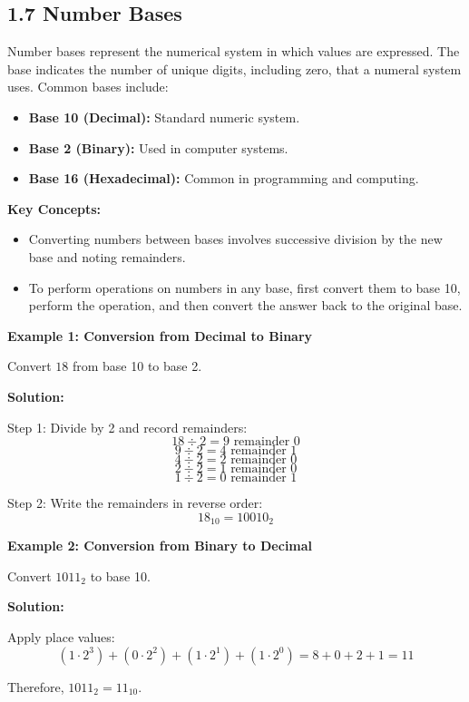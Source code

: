 \subsection*{1.7 Number Bases}

Number bases represent the numerical system in which values are expressed. The base indicates the number of unique digits, including zero, that a numeral system uses. Common bases include:

\begin{itemize}
    \item \textbf{Base 10 (Decimal):} Standard numeric system.
    \item \textbf{Base 2 (Binary):} Used in computer systems.
    \item \textbf{Base 16 (Hexadecimal):} Common in programming and computing.
\end{itemize}

\textbf{Key Concepts:}
\begin{itemize}
    \item Converting numbers between bases involves successive division by the new base and noting remainders.
    \item To perform operations on numbers in any base, first convert them to base 10, perform the operation, and then convert the answer back to the original base.
\end{itemize}

\begin{flushleft}
\textbf{Example 1: Conversion from Decimal to Binary}

Convert \(18\) from base 10 to base 2.

\textbf{Solution:} \vspace{0.2cm}

Step 1: Divide by 2 and record remainders:  
\[
18 \div 2 = 9 \text{ remainder } 0
\]
\[
9 \div 2 = 4 \text{ remainder } 1
\]
\[
4 \div 2 = 2 \text{ remainder } 0
\]
\[
2 \div 2 = 1 \text{ remainder } 0
\]
\[
1 \div 2 = 0 \text{ remainder } 1
\]

Step 2: Write the remainders in reverse order:  
\[
18_{10} = 10010_2
\]
\end{flushleft}

\begin{flushleft}
\textbf{Example 2: Conversion from Binary to Decimal}

Convert \(1011_2\) to base 10.

\textbf{Solution:} \vspace{0.2cm}

Apply place values:  
\[
(1 \cdot 2^3) + (0 \cdot 2^2) + (1 \cdot 2^1) + (1 \cdot 2^0) = 8 + 0 + 2 + 1 = 11
\]

Therefore, \(1011_2 = 11_{10}\).
\end{flushleft}


